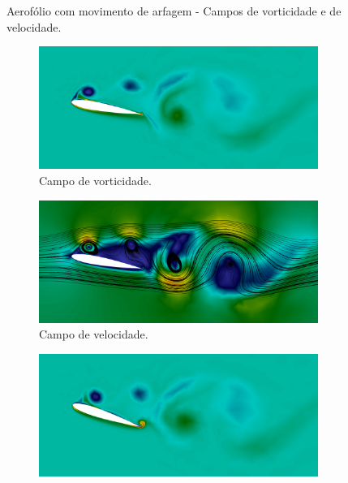 \begin{figure}[h!]
    \centering
    \caption{Aerofólio com movimento de arfagem - Campos de vorticidade e de velocidade.}
    \begin{subfigure}{.45\linewidth}
        \centering
        \caption*{Campo de vorticidade.}
        \includegraphics[width=\linewidth]{Figuras/rotating-airfoil/vort1.png}
    \end{subfigure}
    \begin{subfigure}{.45\linewidth}
        \centering
        \caption*{Campo de velocidade.}
        \includegraphics[width=\linewidth]{Figuras/rotating-airfoil/str1.png}
    \end{subfigure}
    \caption*{Instante $t=8,0$.}
    \begin{subfigure}{.45\linewidth}
        \centering
        \includegraphics[width=\linewidth]{Figuras/rotating-airfoil/vort2.png}

\end{subfigure}
\end{figure}
